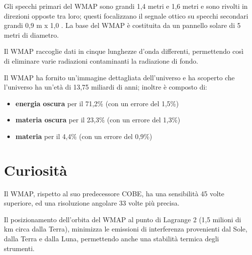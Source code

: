 \documentclass[12pt,a4paper]{article}
\begin{document}
Gli specchi primari del WMAP sono grandi 1,4 metri e 1,6 metri e sono rivolti in direzioni opposte tra loro; questi focalizzano il segnale ottico su specchi secondari grandi 0,9 m x 1,0 . La base del WMAP è costituita da un pannello solare di 5 metri di diametro.

Il WMAP raccoglie dati in cinque lunghezze d'onda differenti, permettendo così di eliminare varie radiazioni contaminanti la radiazione di fondo.

Il WMAP ha fornito un'immagine dettagliata dell'universo e ha scoperto che l'universo ha un'età di 13,75 miliardi di anni; inoltre è composto di:

\begin{itemize}
\item \textbf{energia oscura} per il 71,2\% (con un errore del 1,5\%)

\item \textbf{materia oscura} per il 23,3\% (con un errore del 1,3\%)

\item \textbf{materia} per il 4,4\% (con un errore del 0,9\%)

\end{itemize}

\section{Curiosità}
\label{curiosit}

Il WMAP, rispetto al suo predecessore COBE, ha una sensibilità 45 volte superiore, ed una risoluzione angolare 33 volte più precisa.

Il posizionamento dell'orbita del WMAP al punto di Lagrange 2 (1,5 milioni di km circa dalla Terra), minimizza le emissioni di interferenza provenienti dal Sole, dalla Terra e dalla Luna, permettendo anche una stabilità termica degli strumenti.
\end{document}
